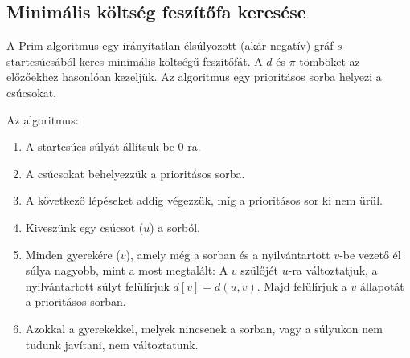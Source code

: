 \documentclass[margin=0px]{article}
\begin{document}
\subsection{Minimális költség feszítőfa keresése}
A Prim algoritmus egy irányítatlan élsúlyozott (akár negatív) gráf $s$ startcsúcsából keres minimális költségű feszítőfát. A $d$ és $\pi$ tömböket az előzőekhez hasonlóan kezeljük. Az algoritmus egy prioritásos sorba helyezi a csúcsokat.

Az algoritmus:
\begin{enumerate}
    \item A startcsúcs súlyát állítsuk be 0-ra.
    \item A csúcsokat behelyezzük a prioritásos sorba.
    \item A következő lépéseket addig végezzük, míg a prioritásos sor ki nem ürül.
    \item Kiveszünk egy csúcsot ($u$) a sorból.
    \item Minden gyerekére ($v$), amely még a sorban és a nyilvántartott $v$-be vezető él súlya nagyobb, mint a most megtalált: A $v$ szülőjét $u$-ra változtatjuk, a nyilvántartott súlyt felülírjuk $d[v] = d(u,v)$. Majd felülírjuk a $v$ állapotát a prioritásos sorban.
    \item Azokkal a gyerekekkel, melyek nincsenek a sorban, vagy a súlyukon nem tudunk javítani, nem változtatunk.
\end{enumerate}
\end{document}
